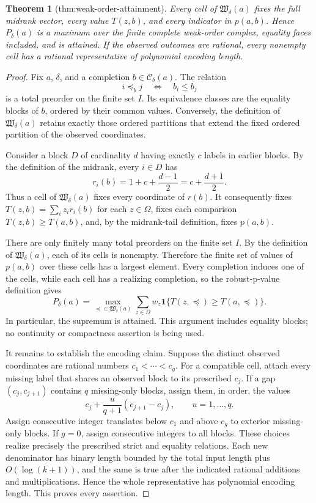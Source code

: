 \documentclass{article}
\newtheorem{theorem}{Theorem}
\begin{document}
\begin{theorem}[thm:weak-order-attainment]\label{thm:weak-order-attainment}
Every cell of \(\mathfrak W_\delta(a)\) fixes the full midrank vector, every value \(T(z,b)\), and every indicator in \(p(a,b)\). Hence \(P_\delta(a)\) is a maximum over the finite complete weak-order complex, equality faces included, and is attained. If the observed outcomes are rational, every nonempty cell has a rational representative of polynomial encoding length.
\end{theorem}
\begin{proof}
Fix \(a\), \(\delta\), and a completion \(b\in\mathcal C_\delta(a)\).  The relation
\[
i\preceq_b j\quad\Longleftrightarrow\quad b_i\le b_j
\]
is a total preorder on the finite set \(I\).  Its equivalence classes are the equality blocks of \(b\), ordered by their common values.  Conversely, the definition of \(\mathfrak W_\delta(a)\) retains exactly those ordered partitions that extend the fixed ordered partition of the observed coordinates.

Consider a block \(D\) of cardinality \(d\) having exactly \(c\) labels in earlier blocks.  By the definition of the midrank, every \(i\in D\) has
\[
r_i(b)=1+c+\frac{d-1}{2}=c+\frac{d+1}{2}.
\]
Thus a cell of \(\mathfrak W_\delta(a)\) fixes every coordinate of \(r(b)\).  It consequently fixes \(T(z,b)=\sum_i z_i r_i(b)\) for each \(z\in\Omega\), fixes each comparison \(T(z,b)\ge T(a,b)\), and, by the midrank-tail definition, fixes \(p(a,b)\).

There are only finitely many total preorders on the finite set \(I\).  By the definition of \(\mathfrak W_\delta(a)\), each of its cells is nonempty.  Therefore the finite set of values of \(p(a,b)\) over these cells has a largest element.  Every completion induces one of the cells, while each cell has a realizing completion, so the robust-p-value definition gives
\[
P_\delta(a)
=\max_{\preceq\in\mathfrak W_\delta(a)}
  \sum_{z\in\Omega}w_z
  \mathbf 1\{T(z,\preceq)\ge T(a,\preceq)\}.
\]
In particular, the supremum is attained.  This argument includes equality blocks; no continuity or compactness assertion is being used.

It remains to establish the encoding claim.  Suppose the distinct observed coordinates are rational numbers \(c_1<\cdots<c_g\).  For a compatible cell, attach every missing label that shares an observed block to its prescribed \(c_j\).  If a gap \((c_j,c_{j+1})\) contains \(q\) missing-only blocks, assign them, in order, the values
\[
c_j+\frac{u}{q+1}(c_{j+1}-c_j),\qquad u=1,\ldots,q.
\]
Assign consecutive integer translates below \(c_1\) and above \(c_g\) to exterior missing-only blocks.  If \(g=0\), assign consecutive integers to all blocks.  These choices realize precisely the prescribed strict and equality relations.  Each new denominator has binary length bounded by the total input length plus \(O(\log(k+1))\), and the same is true after the indicated rational additions and multiplications.  Hence the whole representative has polynomial encoding length.  This proves every assertion.
\end{proof}
\end{document}
